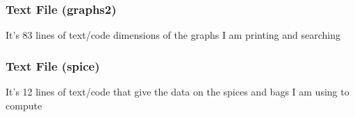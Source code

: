 \documentclass[10pt]{article}
\begin{document}
\subsubsection{Text File (graphs2)}
\lstset{numbers=left, numberstyle=\tiny, stepnumber=1, numbersep=5pt, basicstyle=\footnotesize\ttfamily}
It's 83 lines of text/code dimensions of the graphs I am printing and searching


\subsubsection{Text File (spice)}
\lstset{numbers=left, numberstyle=\tiny, stepnumber=1, numbersep=5pt, basicstyle=\footnotesize\ttfamily}
It's 12 lines of text/code that give the data on the spices and bags I am using to compute
\end{document}
